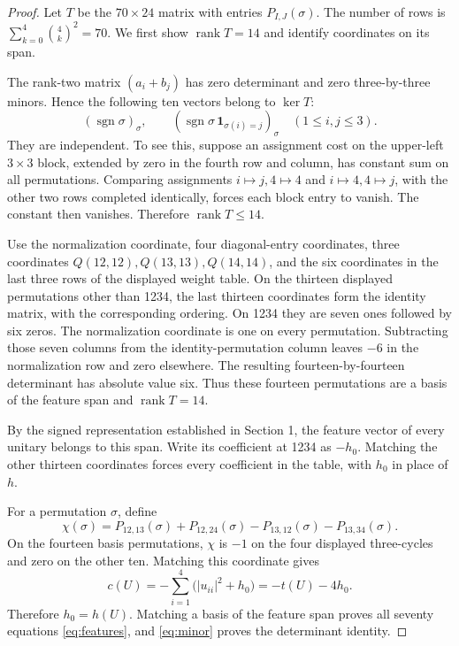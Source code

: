 \documentclass[11pt,a4paper]{article}
\newcommand{\sgn}{\operatorname{sgn}}
\begin{document}
\begin{proof}
Let $T$ be the $70\times24$ matrix with entries $P_{I,J}(\sigma)$. The number of rows is $\sum_{k=0}^4\binom4k^2=70$. We first show $\operatorname{rank}T=14$ and identify coordinates on its span.

The rank-two matrix $(a_i+b_j)$ has zero determinant and zero three-by-three minors. Hence the following ten vectors belong to $\ker T$:
\[
(\sgn\sigma)_\sigma,\qquad
(\sgn\sigma\,\mathbf1_{\sigma(i)=j})_\sigma\quad(1\le i,j\le3).
\]
They are independent. To see this, suppose an assignment cost on the upper-left $3\times3$ block, extended by zero in the fourth row and column, has constant sum on all permutations. Comparing assignments $i\mapsto j,4\mapsto4$ and $i\mapsto4,4\mapsto j$, with the other two rows completed identically, forces each block entry to vanish. The constant then vanishes. Therefore $\operatorname{rank}T\le14$.

Use the normalization coordinate, four diagonal-entry coordinates, three coordinates $Q(12,12),Q(13,13),Q(14,14)$, and the six coordinates in the last three rows of the displayed weight table. On the thirteen displayed permutations other than 1234, the last thirteen coordinates form the identity matrix, with the corresponding ordering. On 1234 they are seven ones followed by six zeros. The normalization coordinate is one on every permutation. Subtracting those seven columns from the identity-permutation column leaves $-6$ in the normalization row and zero elsewhere. The resulting fourteen-by-fourteen determinant has absolute value six. Thus these fourteen permutations are a basis of the feature span and $\operatorname{rank}T=14$.

By the signed representation established in Section 1, the feature vector of every unitary belongs to this span. Write its coefficient at 1234 as $-h_0$. Matching the other thirteen coordinates forces every coefficient in the table, with $h_0$ in place of $h$.

For a permutation $\sigma$, define
\[
\chi(\sigma)=P_{12,13}(\sigma)+P_{12,24}(\sigma)-P_{13,12}(\sigma)-P_{13,34}(\sigma).
\]
On the fourteen basis permutations, $\chi$ is $-1$ on the four displayed three-cycles and zero on the other ten. Matching this coordinate gives
\[
c(U)=-\sum_{i=1}^4\bigl(|u_{ii}|^2+h_0\bigr)=-t(U)-4h_0.
\]
Therefore $h_0=h(U)$. Matching a basis of the feature span proves all seventy equations \eqref{eq:features}, and \eqref{eq:minor} proves the determinant identity.
\end{proof}
\end{document}
